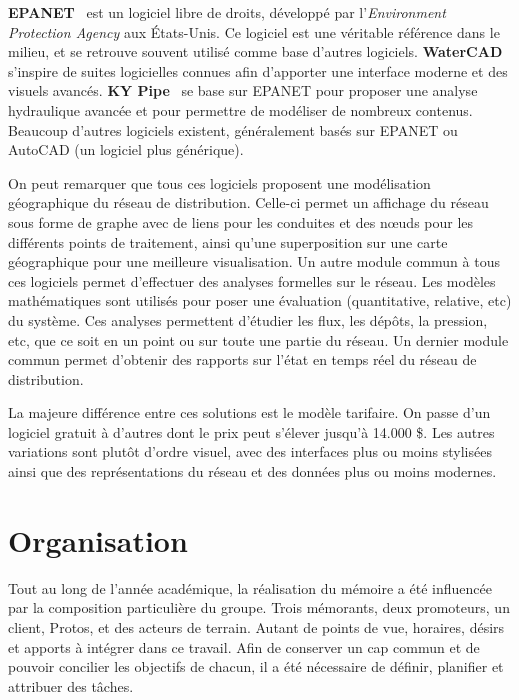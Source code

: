 \documentclass{EPL-master-thesis-covers-FR}
\begin{document}
			\textbf{EPANET}~\cite{ref:epanet} est un logiciel libre de droits, développé par l'\emph{Environment Protection Agency} aux États-Unis. Ce logiciel est une véritable référence dans le milieu, et se retrouve souvent utilisé comme base d'autres logiciels. \textbf{WaterCAD}~\cite{ref:watercad} s'inspire de suites logicielles connues afin d'apporter une interface moderne et des visuels avancés. \textbf{KY Pipe}~\cite{ref:kypipe} se base sur EPANET pour proposer une analyse hydraulique avancée et pour permettre de modéliser de nombreux contenus. Beaucoup d'autres logiciels existent, généralement basés sur EPANET ou AutoCAD (un logiciel plus générique).

			On peut remarquer que tous ces logiciels proposent une modélisation géographique du réseau de distribution. Celle-ci permet un affichage du réseau sous forme de graphe avec de liens pour les conduites et des nœuds pour les différents points de traitement, ainsi qu'une superposition sur une carte géographique pour une meilleure visualisation. Un autre module commun à tous ces logiciels permet d'effectuer des analyses formelles sur le réseau. Les modèles mathématiques sont utilisés pour poser une évaluation (quantitative, relative, etc) du système. Ces analyses permettent d'étudier les flux, les dépôts, la pression, etc, que ce soit en un point ou sur toute une partie du réseau. Un dernier module commun permet d'obtenir des rapports sur l'état en temps réel du réseau de distribution.

			La majeure différence entre ces solutions est le modèle tarifaire. On passe d'un logiciel gratuit à d'autres dont le prix peut s'élever jusqu'à 14.000 \$. Les autres variations sont plutôt d'ordre visuel, avec des interfaces plus ou moins stylisées ainsi que des représentations du réseau et des données plus ou moins modernes.

	\chapter{Organisation}

		Tout au long de l'année académique, la réalisation du mémoire a été influencée par la composition particulière du groupe. Trois mémorants, deux promoteurs, un client, Protos, et des acteurs de terrain. Autant de points de vue, horaires, désirs et apports à intégrer dans ce travail. Afin de conserver un cap commun et de pouvoir concilier les objectifs de chacun, il a été nécessaire de définir, planifier et attribuer des tâches. %
\end{document}
